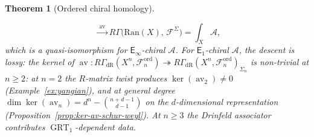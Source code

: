 \documentclass[11pt,reqno]{amsart}
\newtheorem{theorem}{Theorem}[section]
\theoremstyle{definition}
\theoremstyle{remark}
\newcommand{\cA}{\mathcal{A}}
\newcommand{\cF}{\mathcal{F}}
\newcommand{\Ran}{\mathrm{Ran}}
\newcommand{\Eone}{\mathsf{E}_{1}}
\newcommand{\Einf}{\mathsf{E}_{\infty}}
\DeclareMathOperator{\av}{av}
\DeclareMathOperator{\GRT}{GRT}
\numberwithin{equation}{section}
\begin{document}
\begin{theorem}[Ordered chiral homology]
\begin{enumerate}[label=\textup{(\roman*)}]
\begin{equation}
    \;\xrightarrow{\;\av\;}
    R\Gamma\bigl(\Ran(X),\, \cF^{\Sigma}\bigr)
    = \int_X \cA,
  \end{equation}
  which is a quasi-isomorphism for $\Einf$-chiral $\cA$.
  For $\Eone$-chiral $\cA$, the descent is lossy:
  the kernel of $\av \colon
  R\Gamma_{\mathrm{dR}}(X^n,
  \cF_n^{\mathrm{ord}})
  \twoheadrightarrow
  R\Gamma_{\mathrm{dR}}(X^n,
  \cF_n^{\mathrm{ord}})_{\Sigma_n}$
  is non-trivial at $n \geq 2$: at $n = 2$ the
  $R$-matrix twist produces $\ker(\av_2) \neq 0$
  (Example~\ref{ex:yangian}), and at general degree
  $\dim\ker(\av_n) = d^n - \binom{n+d-1}{d-1}$
  on the $d$-dimensional representation
  (Proposition~\ref{prop:ker-av-schur-weyl}).
  At $n \geq 3$
  the Drinfeld associator contributes
  $\GRT_1$-dependent data.
\end{enumerate}
\end{theorem}
\end{document}

